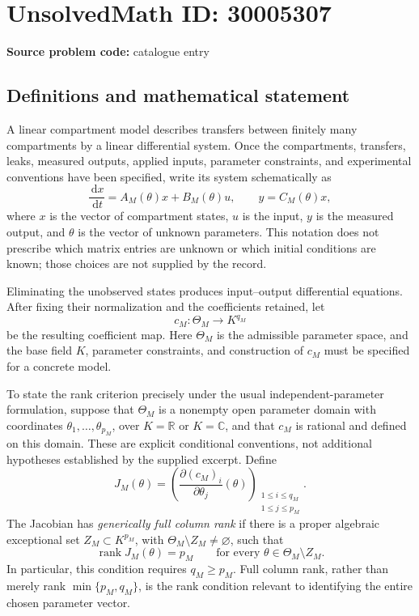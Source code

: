 \documentclass[11pt]{article}
\newcommand{\R}{\mathbb{R}}
\newcommand{\C}{\mathbb{C}}
\newcommand{\dd}{\,\mathrm{d}}
\begin{document}
\section*{UnsolvedMath ID: 30005307}
\textbf{Source problem code:} catalogue entry
\subsection{Definitions and mathematical statement}
A linear compartment model describes transfers between finitely many compartments by a linear differential system. Once the compartments, transfers, leaks, measured outputs, applied inputs, parameter constraints, and experimental conventions have been specified, write its system schematically as
\[
\frac{\dd x}{\dd t}=A_M(\theta)x+B_M(\theta)u,
\qquad y=C_M(\theta)x,
\]
where \(x\) is the vector of compartment states, \(u\) is the input, \(y\) is the measured output, and \(\theta\) is the vector of unknown parameters. This notation does not prescribe which matrix entries are unknown or which initial conditions are known; those choices are not supplied by the record.

Eliminating the unobserved states produces input--output differential equations. After fixing their normalization and the coefficients retained, let
\[
c_M:\Theta_M\longrightarrow K^{q_M}
\]
be the resulting coefficient map. Here \(\Theta_M\) is the admissible parameter space, and the base field \(K\), parameter constraints, and construction of \(c_M\) must be specified for a concrete model.

To state the rank criterion precisely under the usual independent-parameter formulation, suppose that \(\Theta_M\) is a nonempty open parameter domain with coordinates \(\theta_1,\ldots,\theta_{p_M}\), over \(K=\R\) or \(K=\C\), and that \(c_M\) is rational and defined on this domain. These are explicit conditional conventions, not additional hypotheses established by the supplied excerpt. Define
\[
J_M(\theta)=\left(\frac{\partial(c_M)_i}{\partial\theta_j}(\theta)\right)_{\substack{1\leq i\leq q_M\\1\leq j\leq p_M}}.
\]
The Jacobian has \emph{generically full column rank} if there is a proper algebraic exceptional set \(Z_M\subset K^{p_M}\), with \(\Theta_M\setminus Z_M\neq\varnothing\), such that
\[
\operatorname{rank}J_M(\theta)=p_M
\qquad\text{for every }\theta\in\Theta_M\setminus Z_M.
\]
In particular, this condition requires \(q_M\geq p_M\). Full column rank, rather than merely rank \(\min\{p_M,q_M\}\), is the rank condition relevant to identifying the entire chosen parameter vector.
\end{document}
